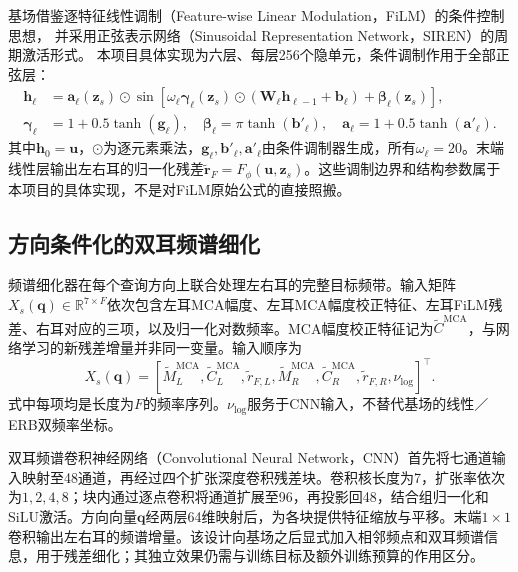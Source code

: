 基场借鉴逐特征线性调制（Feature-wise Linear Modulation，FiLM）的条件控制思想\cite{R7}，%
并采用正弦表示网络（Sinusoidal Representation Network，SIREN）的周期激活形式\cite{R11}。%
本项目具体实现为六层、每层256个隐单元，条件调制作用于全部正弦层：
\begin{align}
\mathbf h_\ell&=\mathbf a_\ell(\mathbf z_s)\odot
\sin\!\left[
\omega_\ell\boldsymbol\gamma_\ell(\mathbf z_s)\odot
(\mathbf W_\ell\mathbf h_{\ell-1}+\mathbf b_\ell)
+\boldsymbol\beta_\ell(\mathbf z_s)\right],\\
\boldsymbol\gamma_\ell&=1+0.5\tanh(\mathbf g_\ell),\quad
\boldsymbol\beta_\ell=\pi\tanh(\mathbf b'_\ell),\quad
\mathbf a_\ell=1+0.5\tanh(\mathbf a'_\ell).
\label{eq:film-siren}
\end{align}
其中$\mathbf h_0=\mathbf u$，$\odot$为逐元素乘法，$\mathbf g_\ell,\mathbf b'_\ell,\mathbf a'_\ell$由条件调制器生成，所有$\omega_\ell=20$。末端线性层输出左右耳的归一化残差$\widetilde{\mathbf r}_F=F_\phi(\mathbf u,\mathbf z_s)$。这些调制边界和结构参数属于本项目的具体实现，不是对FiLM原始公式的直接照搬。

\subsection{方向条件化的双耳频谱细化}
频谱细化器在每个查询方向上联合处理左右耳的完整目标频带。输入矩阵$X_s(\mathbf q)\in\mathbb R^{7\times F}$依次包含左耳MCA幅度、左耳MCA幅度校正特征、左耳FiLM残差、右耳对应的三项，以及归一化对数频率。MCA幅度校正特征记为$\widetilde C^{\mathrm{MCA}}$，与网络学习的新残差增量并非同一变量。输入顺序为
\begin{equation}
X_s(\mathbf q)=
[\widetilde M_L^{\mathrm{MCA}},
 \widetilde C_L^{\mathrm{MCA}},\widetilde r_{F,L},
 \widetilde M_R^{\mathrm{MCA}},
 \widetilde C_R^{\mathrm{MCA}},\widetilde r_{F,R},
 \nu_{\log}]^\top .
\label{eq:cnn-input}
\end{equation}
式中每项均是长度为$F$的频率序列。$\nu_{\log}$服务于CNN输入，不替代基场的线性／ERB双频率坐标。

双耳频谱卷积神经网络（Convolutional Neural Network，CNN）首先将七通道输入映射至48通道，再经过四个扩张深度卷积残差块。卷积核长度为7，扩张率依次为$1,2,4,8$；块内通过逐点卷积将通道扩展至96，再投影回48，结合组归一化和SiLU激活。方向向量$\mathbf q$经两层64维映射后，为各块提供特征缩放与平移。末端$1\times1$卷积输出左右耳的频谱增量。该设计向基场之后显式加入相邻频点和双耳频谱信息，用于残差细化；其独立效果仍需与训练目标及额外训练预算的作用区分。

